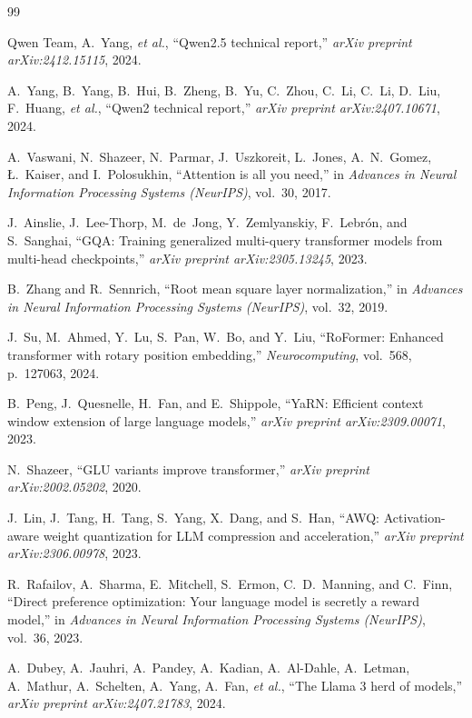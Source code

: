 \documentclass[conference]{IEEEtran}
\begin{document}
\begin{thebibliography}{99}

Qwen Team, A.~Yang, \textit{et al.}, ``Qwen2.5 technical report,'' \textit{arXiv preprint arXiv:2412.15115}, 2024.

A.~Yang, B.~Yang, B.~Hui, B.~Zheng, B.~Yu, C.~Zhou, C.~Li, C.~Li, D.~Liu, F.~Huang, \textit{et al.}, ``Qwen2 technical report,'' \textit{arXiv preprint arXiv:2407.10671}, 2024.

A.~Vaswani, N.~Shazeer, N.~Parmar, J.~Uszkoreit, L.~Jones, A.~N.~Gomez, {\L}.~Kaiser, and I.~Polosukhin, ``Attention is all you need,'' in \textit{Advances in Neural Information Processing Systems (NeurIPS)}, vol.~30, 2017.

J.~Ainslie, J.~Lee-Thorp, M.~de~Jong, Y.~Zemlyanskiy, F.~Lebr{\'o}n, and S.~Sanghai, ``GQA: Training generalized multi-query transformer models from multi-head checkpoints,'' \textit{arXiv preprint arXiv:2305.13245}, 2023.

B.~Zhang and R.~Sennrich, ``Root mean square layer normalization,'' in \textit{Advances in Neural Information Processing Systems (NeurIPS)}, vol.~32, 2019.

J.~Su, M.~Ahmed, Y.~Lu, S.~Pan, W.~Bo, and Y.~Liu, ``RoFormer: Enhanced transformer with rotary position embedding,'' \textit{Neurocomputing}, vol.~568, p.~127063, 2024.

B.~Peng, J.~Quesnelle, H.~Fan, and E.~Shippole, ``YaRN: Efficient context window extension of large language models,'' \textit{arXiv preprint arXiv:2309.00071}, 2023.

N.~Shazeer, ``GLU variants improve transformer,'' \textit{arXiv preprint arXiv:2002.05202}, 2020.

J.~Lin, J.~Tang, H.~Tang, S.~Yang, X.~Dang, and S.~Han, ``AWQ: Activation-aware weight quantization for LLM compression and acceleration,'' \textit{arXiv preprint arXiv:2306.00978}, 2023.

R.~Rafailov, A.~Sharma, E.~Mitchell, S.~Ermon, C.~D.~Manning, and C.~Finn, ``Direct preference optimization: Your language model is secretly a reward model,'' in \textit{Advances in Neural Information Processing Systems (NeurIPS)}, vol.~36, 2023.

A.~Dubey, A.~Jauhri, A.~Pandey, A.~Kadian, A.~Al-Dahle, A.~Letman, A.~Mathur, A.~Schelten, A.~Yang, A.~Fan, \textit{et al.}, ``The Llama 3 herd of models,'' \textit{arXiv preprint arXiv:2407.21783}, 2024.

\end{thebibliography}
\end{document}
